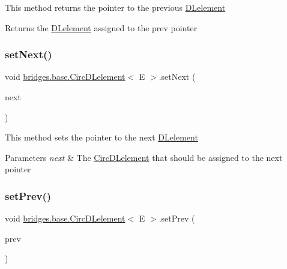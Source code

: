 This method returns the pointer to the previous \hyperlink{classbridges_1_1base_1_1_d_lelement}{D\+Lelement}

\begin{DoxyReturn}{Returns}
the \hyperlink{classbridges_1_1base_1_1_d_lelement}{D\+Lelement} assigned to the prev pointer 
\end{DoxyReturn}
\hypertarget{classbridges_1_1base_1_1_circ_d_lelement_ae3a0c83ecc08289199344cd440f2ebe4}{}\label{classbridges_1_1base_1_1_circ_d_lelement_ae3a0c83ecc08289199344cd440f2ebe4} 
\subsubsection{\texorpdfstring{set\+Next()}{setNext()}}
{\footnotesize\ttfamily void \hyperlink{classbridges_1_1base_1_1_circ_d_lelement}{bridges.\+base.\+Circ\+D\+Lelement}$<$ E $>$.set\+Next (\begin{DoxyParamCaption}\item[{\hyperlink{classbridges_1_1base_1_1_circ_d_lelement}{Circ\+D\+Lelement}$<$ E $>$}]{next }\end{DoxyParamCaption})}

This method sets the pointer to the next \hyperlink{classbridges_1_1base_1_1_d_lelement}{D\+Lelement}


\begin{DoxyParams}{Parameters}
{\em next} & The \hyperlink{classbridges_1_1base_1_1_circ_d_lelement}{Circ\+D\+Lelement} that should be assigned to the next pointer \\
\hline
\end{DoxyParams}
\hypertarget{classbridges_1_1base_1_1_circ_d_lelement_ade2cf166a572c051cd284f4e5ba67780}{}\label{classbridges_1_1base_1_1_circ_d_lelement_ade2cf166a572c051cd284f4e5ba67780} 
\subsubsection{\texorpdfstring{set\+Prev()}{setPrev()}}
{\footnotesize\ttfamily void \hyperlink{classbridges_1_1base_1_1_circ_d_lelement}{bridges.\+base.\+Circ\+D\+Lelement}$<$ E $>$.set\+Prev (\begin{DoxyParamCaption}\item[{\hyperlink{classbridges_1_1base_1_1_circ_d_lelement}{Circ\+D\+Lelement}$<$ E $>$}]{prev }\end{DoxyParamCaption})}

